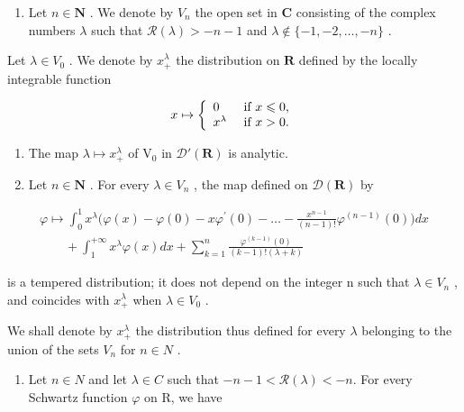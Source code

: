 \begin{enumerate}
\def\labelenumi{\arabic{enumi})}
\setcounter{enumi}{19}
\tightlist
\item
  Let \(n \in \mathbf{N}\) . We denote by \(V_n\) the open set in \(\mathbf{C}\) consisting of the complex numbers \(\lambda\) such that \(\mathcal{R}(\lambda) > -n - 1\) and \(\lambda \notin \{-1, -2, \ldots, -n\}\) .
\end{enumerate}

Let \(\lambda\in V_{0}\) . We denote by \(x_{+}^{\lambda}\) the distribution on \(\mathbf{R}\) defined by the locally integrable function

\[
x \mapsto \left\{ \begin{array}{l l} 0 & \text { if } x \leqslant 0, \\ x ^ {\lambda} & \text { if } x > 0. \end{array} \right.
\]

\begin{enumerate}
\def\labelenumi{\alph{enumi})}
\item
  The map \(\lambda \mapsto x_{+}^{\lambda}\) of \(\mathrm{V}_0\) in \(\mathcal{D}'(\mathbf{R})\) is analytic.
\item
  Let \(n \in \mathbf{N}\) . For every \(\lambda \in V_n\) , the map defined on \(\mathcal{D}(\mathbf{R})\) by
\end{enumerate}

\[
\begin{array}{l} \varphi \mapsto \int_ {0} ^ {1} x ^ {\lambda} \Big (\varphi (x) - \varphi (0) - x \varphi^ {\prime} (0) - \dots - \frac {x ^ {n - 1}}{(n - 1) !} \varphi^ {(n - 1)} (0) \Big) d x \\ \qquad + \int_ {1} ^ {+ \infty} x ^ {\lambda} \varphi (x) d x + \sum_ {k = 1} ^ {n} \frac {\varphi^ {(k - 1)} (0)}{(k - 1) ! (\lambda + k)} \end{array}
\]

is a tempered distribution; it does not depend on the integer n such that \(\lambda \in V_{n}\) , and coincides with \(x_{+}^{\lambda}\) when \(\lambda \in V_{0}\) .

We shall denote by \(x_{+}^{\lambda}\) the distribution thus defined for every \(\lambda\) belonging to the union of the sets \(V_{n}\) for \(n \in N\) .

\begin{enumerate}
\def\labelenumi{\alph{enumi})}
\setcounter{enumi}{2}
\tightlist
\item
  Let \(n \in N\) and let \(\lambda \in C\) such that \(-n - 1 < \mathcal{R}(\lambda) < -n\). For every Schwartz function \(\varphi\) on R, we have
\end{enumerate}

